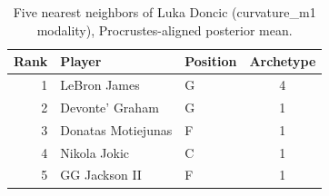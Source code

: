 \begin{table}[htbp]
  \centering\small
  \begin{tabular}{rllc}
    \toprule
    Rank & Player & Position & Archetype \\
    \midrule
    1 & LeBron James & G & 4 \\
    2 & Devonte' Graham & G & 1 \\
    3 & Donatas Motiejunas & F & 1 \\
    4 & Nikola Jokic & C & 1 \\
    5 & GG Jackson II & F & 1 \\
    \bottomrule
  \end{tabular}
  \caption{Five nearest neighbors of Luka Doncic (curvature_m1 modality), Procrustes-aligned posterior mean.}
  \label{tab:Luka_Doncic_neighbors_curvature_m1}
\end{table}

